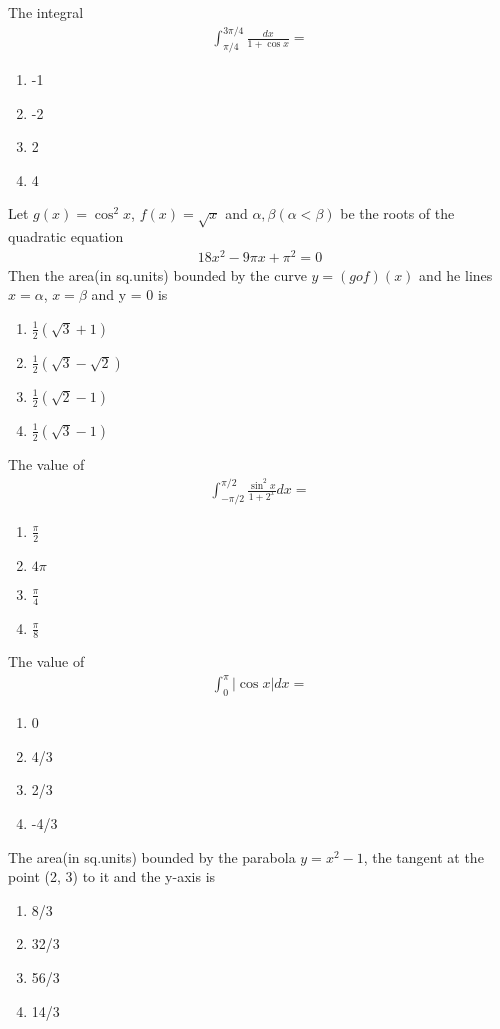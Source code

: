 \item The integral
\begin{align*}
\int_{\pi/4}^{3\pi/4}\frac{dx}{1 + \cos x} = 
\end{align*}
\begin{enumerate}
\item -1
\item -2
\item 2
\item 4
\end{enumerate}

\item Let $g(x) = \cos^{2}x$, $f(x) = \sqrt{x}$ and $\alpha, \beta (\alpha < \beta)$ be the roots of the quadratic equation
\begin{align}
18x^2 - 9\pi x + \pi^2 = 0
\end{align} 
Then the area(in sq.units) bounded by the curve $y = (gof)(x)$ and he lines $x = \alpha$, $x = \beta$ and y = 0 is
\begin{enumerate}
\item $\frac{1}{2}(\sqrt{3} + 1)$
\item $\frac{1}{2}(\sqrt{3} - \sqrt{2})$
\item $\frac{1}{2}(\sqrt{2} - 1)$
\item $\frac{1}{2}(\sqrt{3} - 1)$
\end{enumerate}

\item The value of
\begin{align*}
\int_{-\pi/2}^{\pi/2}\frac{\sin^{2}x}{1 + 2^{x}}dx = 
\end{align*}
\begin{enumerate}
\item $\frac{\pi}{2}$
\item $4\pi$
\item $\frac{\pi}{4}$
\item $\frac{\pi}{8}$
\end{enumerate}

\item The value of
\begin{align*}
\int_{0}^{\pi}|\cos x|dx = 
\end{align*}
\begin{enumerate}
\item 0
\item 4/3
\item 2/3
\item -4/3
\end{enumerate}

\item The area(in sq.units) bounded by the parabola $y = x^2 - 1$, the tangent at the point (2, 3) to it and the y-axis is
\begin{enumerate}
\item 8/3
\item 32/3
\item 56/3
\item 14/3
\end{enumerate}

